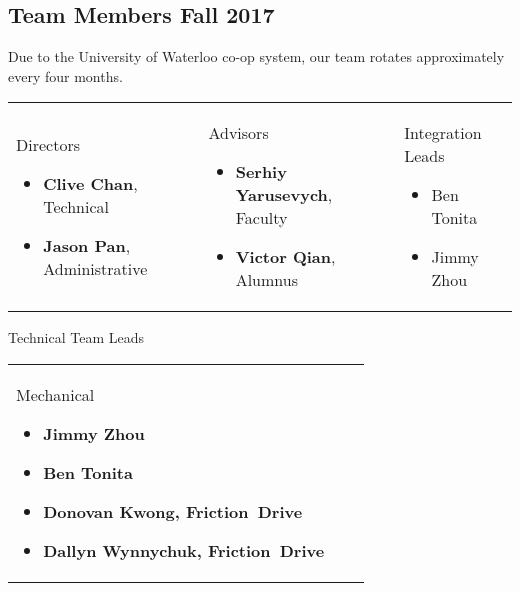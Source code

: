 \documentclass[main.tex]{subfiles}
\begin{document}
\subsection{Team Members Fall 2017}
Due to the University of Waterloo co-op system, our team rotates approximately every four months.

\begin{flushleft}
\begin{tabularx}{\linewidth}{@{}XXX@{}}
	\begin{center}\large{Directors}\end{center}
    \begin{itemize}[label={},noitemsep]
        \item \textbf{Clive Chan}, Technical
        \item \textbf{Jason Pan}, Administrative
    \end{itemize}
    &
    \begin{center}\large{Advisors}\end{center}
    \begin{itemize}[label={},noitemsep]
        \item \textbf{Serhiy Yarusevych}, Faculty
        \item \textbf{Victor Qian}, Alumnus
    \end{itemize}
    &
    \begin{center}\large{Integration Leads}\end{center}
    \begin{itemize}[label={},noitemsep]
        \item Ben Tonita
        \item Jimmy Zhou
    \end{itemize}
\end{tabularx}
\newpage
\begin{center}\large{Technical Team Leads}\end{center}
\begin{tabularx}{\linewidth}{@{}XXX@{}}
    \begin{center}\large{Mechanical}\end{center}
    \begin{itemize}[label={},noitemsep]
    \item \textbf{Jimmy Zhou}
    \item \textbf{Ben Tonita}
    \item \textbf{Donovan Kwong, Friction~Drive}
    \item \textbf{Dallyn Wynnychuk, Friction~Drive}
    \end{itemize}

\end{tabularx}
\end{flushleft}
\end{document}
